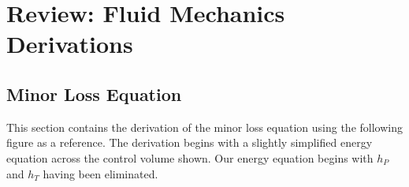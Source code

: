 \documentclass[letterpaper,10pt,english]{sphinxmanual}
\begin{document}
\chapter{Review: Fluid Mechanics Derivations}
\label{\detokenize{Review/Review_Fluid_Mechanics_Derivations:review-fluid-mechanics-derivations}}\label{\detokenize{Review/Review_Fluid_Mechanics_Derivations:title-review-fluid-mechanics-derivations}}\label{\detokenize{Review/Review_Fluid_Mechanics_Derivations::doc}}

\section{Minor Loss Equation}
\label{\detokenize{Review/Review_Fluid_Mechanics_Derivations:minor-loss-equation}}\label{\detokenize{Review/Review_Fluid_Mechanics_Derivations:heading-minor-loss-equation-derivation}}
This section contains the derivation of the minor loss equation using the following figure as a reference. The derivation begins with a slightly simplified energy equation across the control volume shown. Our energy equation begins with \(h_P\) and \(h_T\) having been
eliminated.
\end{document}
